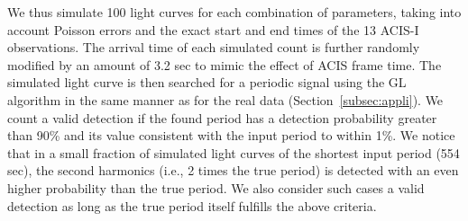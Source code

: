 \documentclass[fleqn,usenatbib]{mnras}
\begin{document}
We thus simulate 100 light curves for each combination of parameters, taking into account Poisson errors and the exact start and end times of the 13 ACIS-I observations. The arrival time of each simulated count is further randomly modified by an amount of 3.2 sec to mimic the effect of ACIS frame time.
The simulated light curve is then searched for a periodic signal using the GL algorithm in the same manner as for the real data (Section~\ref{subsec:appli}).
We count a valid detection if the found period has a detection probability greater than 90\% and its value consistent with the input period to within 1\%. 
We notice that in a small fraction of simulated light curves of the shortest input period (554 sec), the second harmonics (i.e., 2 times the true period) is detected with an even higher probability than the true period. We also consider such cases a valid detection as long as the true period itself fulfills the above criteria.
\end{document}
